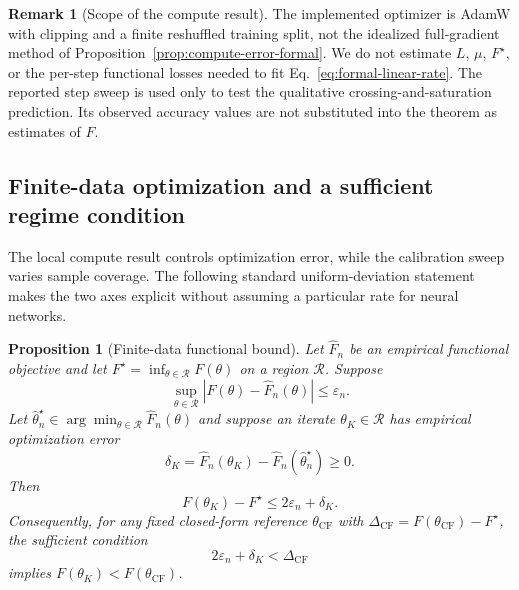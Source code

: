 \documentclass[letterpaper]{article} %
\theoremstyle{plain}
\newtheorem{proposition}[theorem]{Proposition}
\theoremstyle{definition}
\newtheorem{remark}[theorem]{Remark}
\begin{document}
\begin{remark}[Scope of the compute result]
The implemented optimizer is AdamW with clipping and a finite reshuffled training split,
not the idealized full-gradient method of Proposition~\ref{prop:compute-error-formal}.
We do not estimate $L$, $\mu$, $F^\star$, or the per-step functional losses needed to fit
Eq.~\eqref{eq:formal-linear-rate}. The reported step sweep is used only to test the
qualitative crossing-and-saturation prediction. Its observed accuracy values are not
substituted into the theorem as estimates of $F$.
\end{remark}


\subsection{Finite-data optimization and a sufficient regime condition}
\label{app:finite-data-regime}

The local compute result controls optimization error, while the calibration sweep varies
sample coverage. The following standard uniform-deviation statement makes the two axes
explicit without assuming a particular rate for neural networks.

\begin{proposition}[Finite-data functional bound]
\label{prop:finite-data-regime}
Let $\widehat F_n$ be an empirical functional objective and let
$F^\star=\inf_{\theta\in\mathcal R}F(\theta)$ on a region $\mathcal R$. Suppose
\begin{equation}
\sup_{\theta\in\mathcal R}|F(\theta)-\widehat F_n(\theta)|\le\varepsilon_n.
\label{eq:uniform-deviation}
\end{equation}
Let $\widehat\theta_n^\star\in\arg\min_{\theta\in\mathcal R}\widehat F_n(\theta)$ and
suppose an iterate $\theta_K\in\mathcal R$ has empirical optimization error
\begin{equation}
\delta_K=
\widehat F_n(\theta_K)-\widehat F_n(\widehat\theta_n^\star)\ge0.
\label{eq:empirical-opt-error}
\end{equation}
Then
\begin{equation}
F(\theta_K)-F^\star\le 2\varepsilon_n+\delta_K.
\label{eq:finite-data-regime-bound}
\end{equation}
Consequently, for any fixed closed-form reference $\theta_{\mathrm{CF}}$ with
$\Delta_{\mathrm{CF}}=F(\theta_{\mathrm{CF}})-F^\star$, the sufficient condition
\begin{equation}
2\varepsilon_n+\delta_K<\Delta_{\mathrm{CF}}
\label{eq:sufficient-regime-condition}
\end{equation}
implies $F(\theta_K)<F(\theta_{\mathrm{CF}})$.
\end{proposition}
\end{document}
